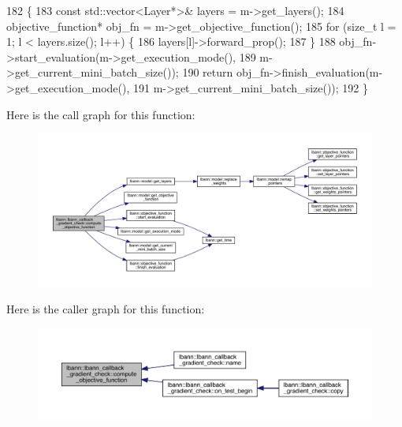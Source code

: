 \begin{DoxyCode}
182                                                                            \{
183   \textcolor{keyword}{const} std::vector<Layer*>& layers = m->get\_layers();
184   objective\_function* obj\_fn = m->get\_objective\_function();
185   \textcolor{keywordflow}{for} (\textcolor{keywordtype}{size\_t} l = 1; l < layers.size(); l++) \{
186     layers[l]->forward\_prop();
187   \}
188   obj\_fn->start\_evaluation(m->get\_execution\_mode(),
189                            m->get\_current\_mini\_batch\_size());
190   \textcolor{keywordflow}{return} obj\_fn->finish\_evaluation(m->get\_execution\_mode(),
191                                    m->get\_current\_mini\_batch\_size());
192 \}
\end{DoxyCode}
Here is the call graph for this function\+:\nopagebreak
\begin{figure}[H]
\begin{center}
\leavevmode
\includegraphics[width=350pt]{classlbann_1_1lbann__callback__gradient__check_a54ba40dd3b381d5c889d77edeffa37f9_cgraph}
\end{center}
\end{figure}
Here is the caller graph for this function\+:\nopagebreak
\begin{figure}[H]
\begin{center}
\leavevmode
\includegraphics[width=350pt]{classlbann_1_1lbann__callback__gradient__check_a54ba40dd3b381d5c889d77edeffa37f9_icgraph}
\end{center}
\end{figure}
\mbox{\label{classlbann_1_1lbann__callback__gradient__check_a3cf248258a45ee721907864d62a17355}} 
